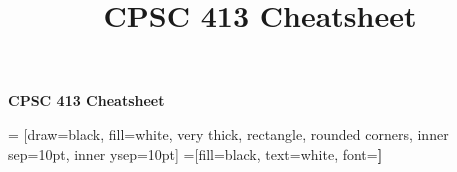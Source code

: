 \documentclass[7pt]{extarticle}
\title{CPSC 413 Cheatsheet}
\begin{document}
\begin{center}
\huge{\textbf{CPSC 413 Cheatsheet}}\\
\end{center}
\begin{multicols*}{3}

 = [draw=black, fill=white, very thick,
    rectangle, rounded corners, inner sep=10pt, inner ysep=10pt]
 =[fill=black, text=white, font=\bfseries]



\end{multicols*}
\end{document}

